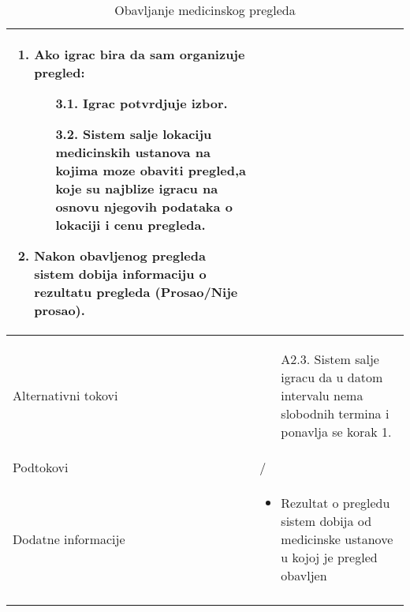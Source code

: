 \documentclass{article}
\begin{document}
\begin{longtable}{| p{} | p{} |}
\begin{enumerate}
        \item Ako igrac bira da sam organizuje pregled:
        \begin{itemize}
            \item[3.1.] Igrac potvrdjuje izbor.
            \item[3.2.] Sistem salje lokaciju medicinskih ustanova na kojima moze obaviti pregled,a  koje su najblize igracu na osnovu njegovih podataka o lokaciji i cenu pregleda.
        \end{itemize}
        \item Nakon obavljenog pregleda sistem dobija informaciju o rezultatu pregleda (Prosao/Nije prosao).
    \end{enumerate}\\
\hline
    Alternativni tokovi & \begin{itemize}
        \item[A2.3.] Sistem salje igracu da u datom intervalu nema slobodnih termina i ponavlja se korak 1.
    \end{itemize}\\
\hline
    Podtokovi & /\\

\hline
    Dodatne informacije & \begin{itemize}
        \item Rezultat o pregledu sistem dobija od medicinske ustanove u kojoj je pregled obavljen
    \end{itemize} \\
\hline
\caption{Obavljanje medicinskog pregleda} %
\end{longtable}


\end{document}
